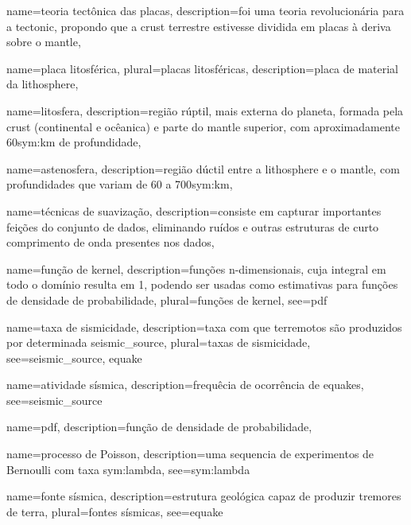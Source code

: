 {
	name={teoria tect{ô}nica das placas},
	description={foi uma teoria revolucionária para a \gls{tectonic},
				propondo que a \gls{crust} terrestre estivesse dividida 
				em placas {à} deriva sobre o \gls{mantle}},
}


{
	name={placa litosf{é}rica},
	plural={placas litosf{é}ricas},
	description={placa de material da \gls{lithosphere}},
}


{
	name={litosfera},
	description={região rúptil, mais externa do planeta, formada pela \gls{crust} 
		(continental e ocêanica) e parte do \gls{mantle} superior, com aproximadamente 
		60\gls*{sym:km} de profundidade},
}


{
	name={astenosfera},
	description={região dúctil entre a \gls{lithosphere} e o \gls{mantle},
				com profundidades que variam de 60 a 700\gls*{sym:km}},
}

{
	name={técnicas de suavização},
	description={consiste em capturar importantes feições do conjunto de dados,
				 eliminando ruídos e outras estruturas de curto comprimento de onda
				 presentes nos dados},
}

{
	name={função de kernel},
	description={funções n-dimensionais, cuja integral em todo o domínio resulta em 1,
				 podendo ser usadas como estimativas para 
				 funções de densidade de probabilidade},
	plural={funções de kernel},
	see={\gls{pdf}}
}

{
	name={taxa de sismicidade},
	description={taxa com que terremotos são produzidos por determinada \gls{seismic_source}},
	plural={taxas de sismicidade},
	see={seismic_source, equake}	
}

{
	name={atividade sísmica},
	description={frequ{ê}cia de ocorr{ê}ncia de \glspl{equake}},
	see={\gls{seismic_source}}	  
}

{
	name={pdf},
	description={função de densidade de probabilidade},
}

{
	name={processo de Poisson},
	description={uma sequencia de experimentos de Bernoulli com taxa \gls{sym:lambda}},
	see={\glsdesc{sym:lambda}}
}

{
	name={fonte sísmica},
	description={estrutura geológica capaz de produzir tremores de terra},
	plural={fontes sísmicas},
	see={equake}	
}

